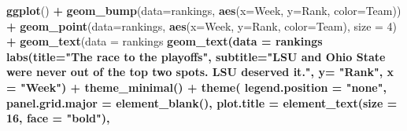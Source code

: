 \documentclass[]{book}
\newenvironment{Shaded}{\begin{snugshade}}{\end{snugshade}}
\newcommand{\DataTypeTok}[1]{\textcolor[rgb]{0.13,0.29,0.53}{#1}}
\newcommand{\DecValTok}[1]{\textcolor[rgb]{0.00,0.00,0.81}{#1}}
\newcommand{\FloatTok}[1]{\textcolor[rgb]{0.00,0.00,0.81}{#1}}
\newcommand{\KeywordTok}[1]{\textcolor[rgb]{0.13,0.29,0.53}{\textbf{#1}}}
\newcommand{\NormalTok}[1]{#1}
\newcommand{\OperatorTok}[1]{\textcolor[rgb]{0.81,0.36,0.00}{\textbf{#1}}}
\newcommand{\StringTok}[1]{\textcolor[rgb]{0.31,0.60,0.02}{#1}}
\begin{document}
\begin{Shaded}
\begin{Highlighting}[]
\KeywordTok{ggplot}\NormalTok{() }\OperatorTok{+}\StringTok{ }
\StringTok{  }\KeywordTok{geom_bump}\NormalTok{(}\DataTypeTok{data=}\NormalTok{rankings, }\KeywordTok{aes}\NormalTok{(}\DataTypeTok{x=}\NormalTok{Week, }\DataTypeTok{y=}\NormalTok{Rank, }\DataTypeTok{color=}\NormalTok{Team)) }\OperatorTok{+}\StringTok{ }
\StringTok{  }\KeywordTok{geom_point}\NormalTok{(}\DataTypeTok{data=}\NormalTok{rankings, }\KeywordTok{aes}\NormalTok{(}\DataTypeTok{x=}\NormalTok{Week, }\DataTypeTok{y=}\NormalTok{Rank, }\DataTypeTok{color=}\NormalTok{Team), }\DataTypeTok{size =} \DecValTok{4}\NormalTok{) }\OperatorTok{+}\StringTok{   }
\StringTok{  }\KeywordTok{geom_text}\NormalTok{(}\DataTypeTok{data =}\NormalTok{ rankings }\OperatorTok{%
\StringTok{  }\KeywordTok{geom_text}\NormalTok{(}\DataTypeTok{data =}\NormalTok{ rankings }\OperatorTok{%
\StringTok{  }\KeywordTok{labs}\NormalTok{(}\DataTypeTok{title=}\StringTok{"The race to the playoffs"}\NormalTok{, }\DataTypeTok{subtitle=}\StringTok{"LSU and Ohio State were never out of the top two spots. LSU deserved it."}\NormalTok{, }\DataTypeTok{y=} \StringTok{"Rank"}\NormalTok{, }\DataTypeTok{x =} \StringTok{"Week"}\NormalTok{) }\OperatorTok{+}
\StringTok{  }\KeywordTok{theme_minimal}\NormalTok{() }\OperatorTok{+}
\StringTok{  }\KeywordTok{theme}\NormalTok{(}
    \DataTypeTok{legend.position =} \StringTok{"none"}\NormalTok{,}
    \DataTypeTok{panel.grid.major =} \KeywordTok{element_blank}\NormalTok{(),}
    \DataTypeTok{plot.title =} \KeywordTok{element_text}\NormalTok{(}\DataTypeTok{size =} \DecValTok{16}\NormalTok{, }\DataTypeTok{face =} \StringTok{"bold"}\NormalTok{),}
}}
\end{Highlighting}
\end{Shaded}
\end{document}
